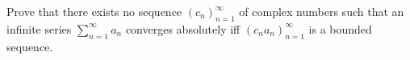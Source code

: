 Prove that there exists no sequence $(c_n)_{n=1}^{\infty}$ of complex numbers such that an infinite series $\sum_{n=1}^{\infty} a_n$ converges absolutely iff $(c_n a_n)_{n=1}^{\infty}$ is a bounded sequence.
